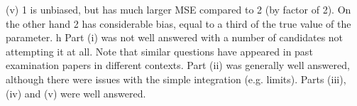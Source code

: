 \documentclass[a4paper,12pt]{article}
\begin{document}
(v)
\hat{\theta} 1 is unbiased, but has much larger MSE compared to \hat{\theta} 2 (by factor of 2). 
On the other hand \hat{\theta} 2 has considerable bias, equal to a third of the true value
of the parameter.
h
Part (i) was not well answered with a number of candidates not
attempting it at all. Note that similar questions have appeared in past
examination papers in different contexts. Part (ii) was generally well
answered, although there were issues with the simple integration (e.g.
limits). Parts (iii), (iv) and (v) were well answered.
\end{document}
